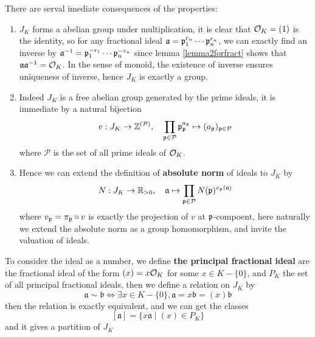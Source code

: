 \begin{remark}
    There are serval imediate consequences of the properties:
    \begin{enumerate}
        \item \(J_K\) forms a abelian group under multiplication, it is clear that \(\mathcal{O}_K=(1)\) is the identity, so for any fractional ideal \(\mathfrak{a} = \mathfrak{p}_1^{r_n} \cdots \mathfrak{p}_n^{r_n}\), we can exactly find an inverse by \(\mathfrak{a}^{-1} = \mathfrak{p}_1^{-r_1} \cdots \mathfrak{p}_n^{-r_n}\) since lemma \ref{lemma2forfract} shows that \(\mathfrak{a}\mathfrak{a}^{-1} = \mathcal{O}_K\). In the sense of monoid, the existence of inverse ensures uniqueness of inverse, hence \(J_K\) is exactly a group.
        \item Indeed \(J_K\) is a free abelian group generated by the prime ideals, it is immediate by a natural bijection
        \[v:  J_K \to \mathbb{Z}^{(\mathcal{P})}  , \quad \prod_{\mathfrak{p} \in \mathcal{P}} \mathfrak{p}_{\mathfrak{p}}^{a_{\mathfrak{p}}} \mapsto  (a_{\mathfrak{p}})_{\mathfrak{p} \in \mathcal{P}} \]
        where \(\mathcal{P}\) is the set of all prime ideals of \(\mathcal{O}_K\).
        \item Hence we can extend the definition of \textbf{absolute norm} of ideals to \(J_K\) by
        \[N: J_K \to \mathbb{R}_{>0}, \quad \mathfrak{a} \mapsto \prod_{\mathfrak{p} \in \mathcal{P}} N(\mathfrak{p})^{v_{\mathfrak{p}}(\mathfrak{a})}\]
        where \(v_{\mathfrak{p}} = \pi_{\mathfrak{p}} \circ v\) is exactly the projection of \(v\) at \(\mathfrak{p}\)-compoent, here naturally we extend the absolute norm as a group homomorphism, and invite the valuation of ideals.
    \end{enumerate}
\end{remark}


     To consider the ideal as a number, we define \textbf{the principal fractional ideal} are the fractional ideal of the form \((x) = x \mathcal{O}_K\) for some \(x \in K-\{0\}\), and \(P_K\) the set of all principal fractional ideals, then we define a relation on \(J_K\) by
        \[\mathfrak{a} \sim \mathfrak{b} \iff \exists x \in K-\{0\}, \mathfrak{a} = x\mathfrak{b} = (x)\mathfrak{b}\]
        then the relation is exactly equivalent, and we can get the classes
        \[[\mathfrak{a}] = \{x\mathfrak{a} \mid (x) \in P_K\}\]
        and it gives a partition of \(J_K\) 

